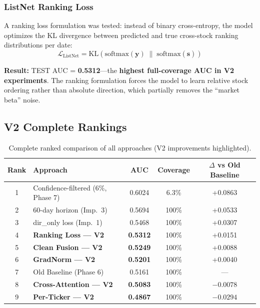 \documentclass[12pt,a4paper]{article}
\begin{document}
\subsubsection{ListNet Ranking Loss}

A ranking loss formulation was tested: instead of binary cross-entropy, the model optimizes the KL divergence between predicted and true cross-stock ranking distributions per date:
\begin{equation}
\mathcal{L}_{\text{ListNet}} = \text{KL}\left(\text{softmax}(\mathbf{y}) \;\|\; \text{softmax}(\hat{\mathbf{s}})\right)
\end{equation}

\textbf{Result:} TEST AUC = \textbf{0.5312}---the \textbf{highest full-coverage AUC in V2 experiments}. The ranking formulation forces the model to learn relative stock ordering rather than absolute direction, which partially removes the ``market beta'' noise.

\subsection{V2 Complete Rankings}
\label{sec:v2rankings}

\begin{table}[H]
\centering
\caption{Complete ranked comparison of all approaches (V2 improvements highlighted).}
\begin{tabular}{clccc}
\toprule
\textbf{Rank} & \textbf{Approach} & \textbf{AUC} & \textbf{Coverage} & \textbf{$\Delta$ vs Old Baseline} \\
\midrule
1 & Confidence-filtered (6\%, Phase 7)  & 0.6024 & 6.3\% & +0.0863 \\
2 & 60-day horizon (Imp.\ 3)            & 0.5694 & 100\% & +0.0533 \\
3 & dir\_only loss (Imp.\ 1)            & 0.5468 & 100\% & +0.0307 \\
4 & \textbf{Ranking Loss --- V2}        & \textbf{0.5312} & 100\% & +0.0151 \\
5 & \textbf{Clean Fusion --- V2}        & \textbf{0.5249} & 100\% & +0.0088 \\
6 & \textbf{GradNorm --- V2}            & \textbf{0.5201} & 100\% & +0.0040 \\
7 & Old Baseline (Phase 6)              & 0.5161 & 100\% & --- \\
8 & \textbf{Cross-Attention --- V2}     & \textbf{0.5083} & 100\% & $-0.0078$ \\
9 & \textbf{Per-Ticker --- V2}          & \textbf{0.4867} & 100\% & $-0.0294$ \\
\bottomrule
\end{tabular}
\end{table}
\end{document}
